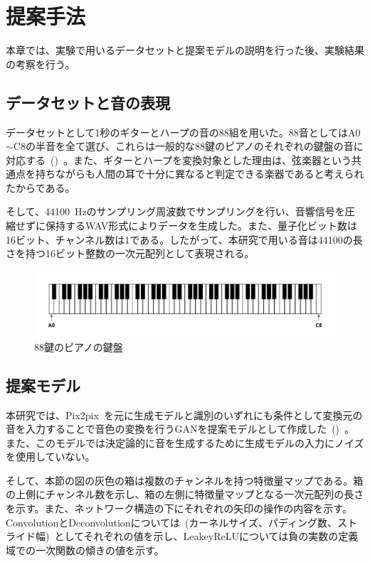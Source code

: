 \chapter{提案手法}

本章では、実験で用いるデータセットと提案モデルの説明を行った後、実験結果の考察を行う。

\section{データセットと音の表現}

データセットとして1秒のギターとハープの音の88組を用いた。88音としてはA0$\sim$C8の半音を全て選び、これらは一般的な88鍵のピアノのそれぞれの鍵盤の音に対応する~()~。また、ギターとハープを変換対象とした理由は、弦楽器という共通点を持ちながらも人間の耳で十分に異なると判定できる楽器であると考えられたからである。

そして、44100~Hzのサンプリング周波数でサンプリングを行い、音響信号を圧縮せずに保持するWAV形式によりデータを生成した。また、量子化ビット数は16ビット、チャンネル数は1である。したがって、本研究で用いる音は44100の長さを持つ16ビット整数の一次元配列として表現される。

\begin{figure}[b]
\centering
\includegraphics[width=0.9\columnwidth]{figure/piano.png}
\caption{88鍵のピアノの鍵盤}
\label{fig:piano}
\end{figure}

\section{提案モデル}
\label{sec:proposed}

本研究では、Pix2pix~\cite{pix2pix}を元に生成モデルと識別のいずれにも条件として変換元の音を入力することで音色の変換を行うGANを提案モデルとして作成した~()~。また、このモデルでは決定論的に音を生成するために生成モデルの入力にノイズを使用していない。

そして、本節の図の灰色の箱は複数のチャンネルを持つ特徴量マップである。箱の上側にチャンネル数を示し、箱の左側に特徴量マップとなる一次元配列の長さを示す。また、ネットワーク構造の下にそれぞれの矢印の操作の内容を示す。ConvolutionとDeconvolutionについては~(カーネルサイズ、パディング数、ストライド幅)~としてそれぞれの値を示し、LeakeyReLUについては負の実数の定義域での一次関数の傾きの値を示す。

